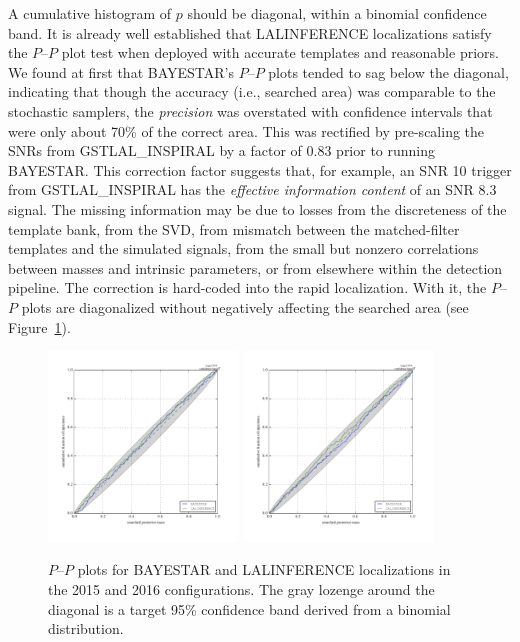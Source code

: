 \documentclass[amsmath,amssymb,aps,prx,reprint,nopreprintnumbers,nofootinbib]{revtex4-1}
\begin{document}
A cumulative histogram of $p$ should be diagonal, within a binomial confidence band. It is already well established that LALINFERENCE localizations satisfy the $P$\nobreakdashes--$P$ plot test when deployed with accurate templates and reasonable priors. We found at first that \ac{BAYESTAR}'s $P$\nobreakdashes--$P$ plots tended to sag below the diagonal, indicating that though the accuracy (i.e., searched area) was comparable to the stochastic samplers, the \emph{precision} was overstated with confidence intervals that were only about 70\% of the correct area. This was rectified by pre\nobreakdashes-scaling the \acp{SNR} from GSTLAL\_INSPIRAL by a factor of 0.83 prior to running \ac{BAYESTAR}. This correction factor suggests that, for example, an \ac{SNR} 10 trigger from GSTLAL\_INSPIRAL has the \emph{effective information content} of an \ac{SNR} 8.3 signal. The missing information may be due to losses from the discreteness of the template bank, from the \ac{SVD}, from mismatch between the matched\nobreakdashes-filter templates and the simulated signals, from the small but nonzero correlations between masses and intrinsic parameters, or from elsewhere within the detection pipeline. The correction is hard\nobreakdashes-coded into the rapid localization. With it, the $P$\nobreakdashes--$P$ plots are diagonalized without negatively affecting the searched area (see Figure~\ref{fig:pp}).

\begin{figure}
    \begin{center}
        \includegraphics[width=0.45\textwidth]{2015-pp}
        \includegraphics[width=0.45\textwidth]{2016-pp}
    \end{center}
    \caption[\acs{BAYESTAR} $P$\nobreakdashes--$P$ plots]{\label{fig:pp}$P$\nobreakdashes--$P$ plots for \ac{BAYESTAR} and LALINFERENCE localizations in the 2015 and 2016 configurations. The gray lozenge around the diagonal is a target 95\% confidence band derived from a binomial distribution.}
\end{figure}
\end{document}
